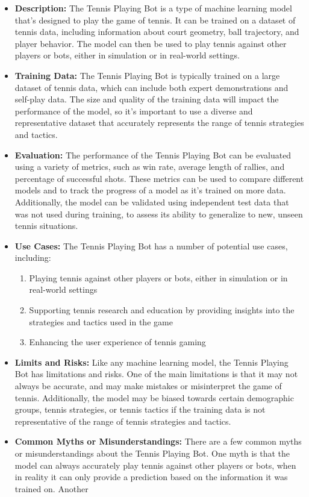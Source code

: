 \begin{itemize}
    \item \textbf{Description:} The Tennis Playing Bot is a type of machine learning model that's designed to play the game of tennis. It can be trained on a dataset of tennis data, including information about court geometry, ball trajectory, and player behavior. The model can then be used to play tennis against other players or bots, either in simulation or in real-world settings.
    \item \textbf{Training Data:} The Tennis Playing Bot is typically trained on a large dataset of tennis data, which can include both expert demonstrations and self-play data. The size and quality of the training data will impact the performance of the model, so it's important to use a diverse and representative dataset that accurately represents the range of tennis strategies and tactics.
    \item \textbf{Evaluation:} The performance of the Tennis Playing Bot can be evaluated using a variety of metrics, such as win rate, average length of rallies, and percentage of successful shots. These metrics can be used to compare different models and to track the progress of a model as it's trained on more data. Additionally, the model can be validated using independent test data that was not used during training, to assess its ability to generalize to new, unseen tennis situations.
    \item \textbf{Use Cases:} The Tennis Playing Bot has a number of potential use cases, including:
        \begin{enumerate}  
            \item Playing tennis against other players or bots, either in simulation or in real-world settings
            \item Supporting tennis research and education by providing insights into the strategies and tactics used in the game
            \item Enhancing the user experience of tennis gaming
        \end{enumerate}
    \item \textbf{Limits and Risks:} Like any machine learning model, the Tennis Playing Bot has limitations and risks. One of the main limitations is that it may not always be accurate, and may make mistakes or misinterpret the game of tennis. Additionally, the model may be biased towards certain demographic groups, tennis strategies, or tennis tactics if the training data is not representative of the range of tennis strategies and tactics.
    \item \textbf{Common Myths or Misunderstandings:} There are a few common myths or misunderstandings about the Tennis Playing Bot. One myth is that the model can always accurately play tennis against other players or bots, when in reality it can only provide a prediction based on the information it was trained on. Another
\end{itemize}


